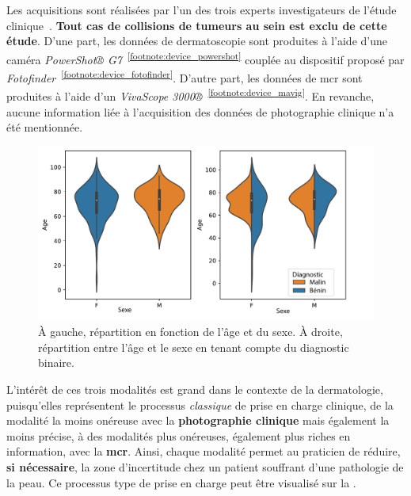 Les acquisitions sont réalisées par l'un des trois experts investigateurs de l'étude clinique~\cite{Cinotti2018}. \textbf{Tout cas de collisions de tumeurs au sein est exclu de cette étude}. D'une part, les données de dermatoscopie sont produites à l'aide d'une caméra \textit{PowerShot® G7}~\textsuperscript{\ref{footnote:device_powershot}} couplée au dispositif proposé par \textit{Fotofinder}~\textsuperscript{\ref{footnote:device_fotofinder}}. D'autre part, les données de \gls{mcr} sont produites à l'aide d'un \textit{VivaScope 3000®}~\textsuperscript{\ref{footnote:device_mavig}}. En revanche, aucune information liée à l'acquisition des données de photographie clinique n'a été mentionnée.\par

\begin{figure}[H]
    \centering
    \includegraphics[width=\linewidth]{contents/chapter_4/resources/statistics_age_sex.pdf}
    \caption{À gauche, répartition en fonction de l'âge et du sexe. À droite, répartition entre l'âge et le sexe en tenant compte du diagnostic binaire.}
    \label{fig:statistics_age_sex}
\end{figure}\par

L'intérêt de ces trois modalités est grand dans le contexte de la dermatologie, puisqu'elles représentent le processus \textit{classique} de prise en charge clinique, de la modalité la moins onéreuse avec la \textbf{photographie clinique} mais également la moins précise, à des modalités plus onéreuses, également plus riches en information, avec la \textbf{\gls{mcr}}. Ainsi, chaque modalité permet au praticien de réduire, \textbf{si nécessaire}, la zone d'incertitude chez un patient souffrant d'une pathologie de la peau. Ce processus type de prise en charge peut être visualisé sur la .\par

